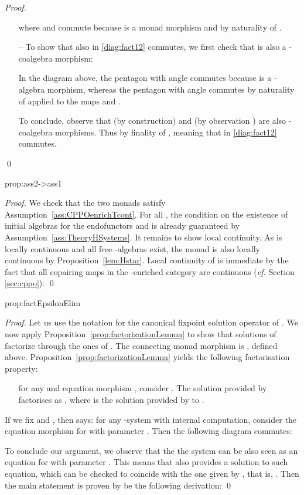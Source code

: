 \documentclass[oribibl,envcountsame,envcountsect,runningheads]{llncs}
\renewcommand{\>}{\rangle}
\newenvironment{proposition_for}[2][\empty]{\bigskip\noindent{\bf
    Proposition~\ref{#2}}\ifthenelse{\equal{#1}{\empty}}{{\bf.}}{ {\bf
      (#1).}}\it}{\vspace{0.5cm}}
\begin{document}
\begin{proof}
\begin{itemize}
      where  and  commute because  is a monad morphism and  by naturality of .
  \item[--] To show that also  in \eqref{diag:fact12} commutes, we first check that  is also a -coalgebra morphism:
        
      In the diagram above, the pentagon with angle  commutes because  is a -algebra morphism, whereas the pentagon with angle  commutes by naturality of  applied to the maps  and .

      To conclude, observe that  (by construction) and  (by observation ) are also -coalgebra morphisms. Thus  by finality of , meaning that  in \eqref{diag:fact12} commutes.
\end{itemize}\qed
\end{proof}


 \begin{proposition_for}{prop:ass2->ass1}
 \propass
 \end{proposition_for}
 \begin{proof} We check that the two monads satisfy Assumption~\ref{ass:CPPOenrichTcont}. For all , the condition on the existence of initial algebras for the endofunctors  and  is already guaranteed by Assumption~\ref{ass:TheoryHSystems}. It remains to show local continuity. As  is locally continuous and all free -algebras exist, the monad  is also locally continuous by Proposition~\ref{lem:Hstar}. Local continuity of  is immediate by the fact that all copairing maps  in the -enriched category  are continuous (\emph{cf.} Section \ref{sec:cppo}).
 \qed
 \end{proof}


 \begin{proposition_for}{prop:factEpsilonElim}
\propfactEpsilonElim
\end{proposition_for}
\begin{proof}
Let us use the notation  for the canonical fixpoint solution operator of . We now apply Proposition~\ref{prop:factorizationLemma} to show that solutions of  factorize through the ones of . The connecting monad morphism is , defined above. Proposition~\ref{prop:factorizationLemma} yields the following factorisation property:
\begin{itemize}
\item[] for any  and equation morphism , consider . The solution  provided by  factorises as , where  is the solution provided by  to .
\end{itemize}
If we fix  and , then  says: for any -system  with internal computation, consider the equation morphism  for  with parameter . Then the following diagram commutes:

To conclude our argument, we observe that the the system  can be also seen as an equation for  with parameter . This means that also  provides a solution to such equation, which can be checked to coincide with the one given by , that is, . Then the main statement is proven by be the following derivation:
 \qed
\end{proof}
\end{document}
